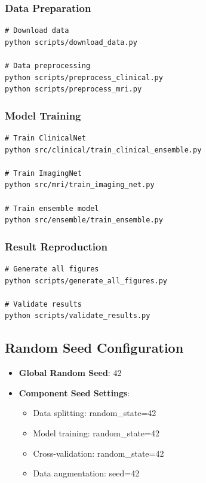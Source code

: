 \documentclass[12pt, a4paper]{article}
\begin{document}
\subsubsection{Data Preparation}
\begin{verbatim}
# Download data
python scripts/download_data.py

# Data preprocessing
python scripts/preprocess_clinical.py
python scripts/preprocess_mri.py
\end{verbatim}

\subsubsection{Model Training}
\begin{verbatim}
# Train ClinicalNet
python src/clinical/train_clinical_ensemble.py

# Train ImagingNet
python src/mri/train_imaging_net.py

# Train ensemble model
python src/ensemble/train_ensemble.py
\end{verbatim}

\subsubsection{Result Reproduction}
\begin{verbatim}
# Generate all figures
python scripts/generate_all_figures.py

# Validate results
python scripts/validate_results.py
\end{verbatim}

\subsection{Random Seed Configuration}
\begin{itemize}
    \item \textbf{Global Random Seed}: 42
    \item \textbf{Component Seed Settings}:
    \begin{itemize}
        \item Data splitting: random\_state=42
        \item Model training: random\_state=42
        \item Cross-validation: random\_state=42
        \item Data augmentation: seed=42
    \end{itemize}
\end{itemize}
\end{document}
